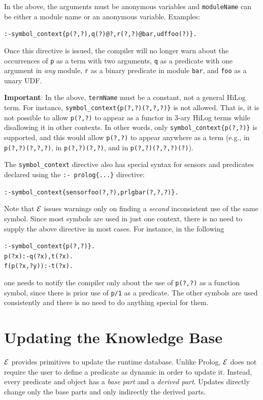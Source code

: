 \documentclass[11pt]{article}
\newcommand{\ERGO}{\mbox{\ensuremath{\cal{E}}\smaller{{\sc{RGO}}}}\xspace}
\newcommand{\FLSYSTEM}{\ERGO}
\begin{document}
In the above, the arguments must be anonymous variables
and \texttt{moduleName} can be either a module name or an anonymous variable.
Examples:
\begin{alltt}
    :- symbol_context\{p(?,?), q(?)@?, r(?,?)@bar, udf foo(?)\}.
\end{alltt}
Once this directive is issued, the compiler will no longer warn about the
occurrences of \texttt{p} as a term with two arguments, \texttt{q} as a
predicate with one argument in \emph{any} module, \texttt{r} as a binary
predicate in module \texttt{bar}, and \texttt{foo} as a unary UDF.      

\textbf{Important}: In the above, \texttt{termName} must be a constant, not
a general HiLog term.  For instance,
\texttt{symbol\_context\{p(?,?)(?,?,?)\}} is not allowed. That is, it is not
possible to allow \texttt{p(?,?)} to appear as a functor in 3-ary HiLog
terms while disallowing it in other contexts. In other words,
only \texttt{symbol\_context\{p(?,?)\}} is supported, and this would allow
\texttt{p(?,?)} to appear anywhere as a term (e.g., in
\texttt{p(?,?)(?,?,?)}, in \texttt{p(?,?)(?,?)}, and in
\texttt{p(?,?)(?,?,?)(?)}).

The \texttt{symbol\_context} directive also
has special syntax for sensors and predicates declared using the
\texttt{:- prolog\{...\}} directive:
\begin{alltt}
   :- symbol_context\{sensor foo(?,?), prlg bar(?,?,?)\}.
\end{alltt}

Note that \FLSYSTEM issues warnings only on finding a \emph{second}
inconsistent use of the same symbol. Since most symbols are used in just
one context, there is no need to supply the above directive  
in most cases. For instance, in the following
\begin{alltt}
    :- symbol_context\{p(?,?)\}.
    p(?x):-q(?x), t(?x).
    f(p(?x,?y)):-t(?x).
\end{alltt}
one needs to notify the compiler only about the use of \texttt{p(?,?)} as a
function symbol, since there is prior use of \texttt{p/1} as a predicate.
The other symbols are used consistently and there is no need to do anything
special for them.


\section{Updating the Knowledge Base}\label{sec-updates}


%
\FLSYSTEM provides primitives to update the runtime database. Unlike Prolog,
\FLSYSTEM does not require the user to define a predicate as dynamic in order
to update it. Instead, every predicate and object
has a \emph{base part} and a \emph{derived part}.  Updates directly change
only the base parts and only indirectly the derived parts.
\end{document}
